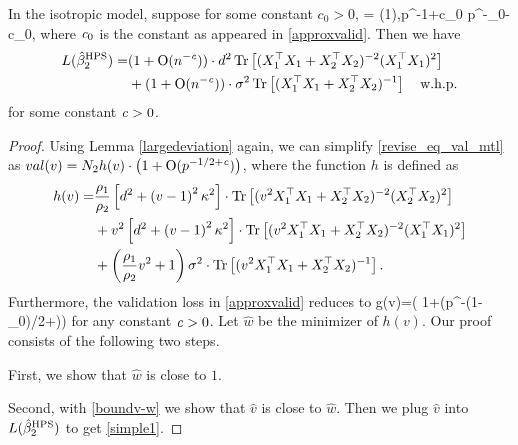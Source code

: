 \begin{lemma}
In the isotropic model, suppose for some constant $c_0>0$, 
\be\label{choiceofpara}
	 = \OO(1),\quad p^{-1+c_0} \le {}  \le p^{-\e_0-c_0},
\ee
where ${\mathit{c}}_0$ is the constant as appeared in \eqref{approxvalid}. Then we have
\begin{align}
L(\hat{\beta}_2^{\textup{HPS}})=&(1+\operatorname{O}(n^{-{\mathit{c}}}))\cdot d^2 \operatorname{Tr}\left[(X_1^{\top}X_1 +X_2^{\top}X_2)^{-2} (X_1^{\top}X_1)^2\right] \nonumber \\
&+(1+\operatorname{O}(n^{-{\mathit{c}}}))\cdot \sigma^2  \operatorname{Tr}\left[(X_1^{\top}X_1  + X_2^{\top}X_2)^{-1} \right] \quad \text{w.h.p.} \label{simple1}
\end{align}
for some constant ${\mathit{c}}>0$.
\end{lemma}

\begin{proof}
	Using Lemma \ref{largedeviation} again, we can simplify \eqref{revise_eq_val_mtl} as $val(v)= N_2h(v) \cdot  \left( 1+\operatorname{O}(p^{-1/2+{\mathit{c}}})\right)$, where the function $ h$ is defined as
	\begin{align}
		h(v) =& \frac{\rho_1}{\rho_2}\left[d^2 +\left( v-1\right)^2\kappa^2\right]\cdot \operatorname{Tr}\left[( v^2X_1^{\top}X_1 +X_2^{\top}X_2)^{-2} (X_2^{\top}X_2)^2\right] \nonumber \\
		& +  v^2\left[d^2 +\left( v-1\right)^2\kappa^2\right]\cdot \operatorname{Tr}\left[( v^2X_1^{\top}X_1 +X_2^{\top}X_2)^{-2} (X_1^{\top}X_1)^2\right] \nonumber\\
		& + \left(\frac{\rho_1}{\rho_2} v^2 + 1\right)\sigma^2 \cdot \operatorname{Tr}\left[(v^2X_1^{\top}X_1  + X_2^{\top}X_2)^{-1} \right]. \nonumber
	\end{align}
	Furthermore, the validation loss in \eqref{approxvalid} reduces to
	\be\label{boundv-w}
		g(v)=\cdot \left( 1+\OO(p^{-(1-\e_0)/2+\e})\right)\quad {}
	\ee
	for any constant ${\mathit{c}}>0$. %
Let $\hat w$ be the minimizer of $h(v)$. Our proof consists of the following two steps.
\squishlist
	\item First, we show that $\hat{w}$ is close to $1$.
	\item Second, with \eqref{boundv-w} we show that $\hat v$ is close to $\hat w$. Then we plug $\hat{v}$ into $L(\hat{\beta}_2^{\textup{HPS}})$ to get \eqref{simple1}.
\squishend

\end{proof}
